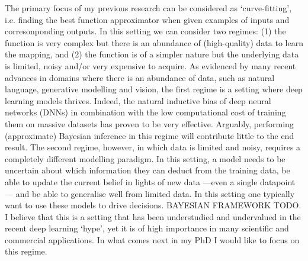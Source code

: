 The primary focus of my previous research can be considered as `curve-fitting', i.e. finding the best function approximator when given examples of inputs and corresonponding outputs. In this setting we can consider two regimes: (1) the function is very complex but there is an abundance of (high-quality) data to learn the mapping, and (2) the function is of a simpler nature but the underlying data is limited, noisy and/or very expensive to acquire. As evidenced by many recent advances in domains where there is an abundance of data, such as natural language, generative modelling and vision, the first regime is a setting where deep learning models thrives. Indeed, the natural inductive bias of deep neural networks (DNNs) in combination with the low computational cost of training them on massive datasets has proven to be very effective. Arguably, performing (approximate) Bayesian inference in this regime will contribute little to the end result. The second regime, however, in which data is limited and noisy, requires a completely different modelling paradigm. In this setting, a model needs to be uncertain about which information they can deduct from the training data, be able to update the current belief in lights of new data ---even a single datapoint--- and be able to generalise well from limited data. In this setting one typically want to use these models to drive decisions. BAYESIAN FRAMEWORK TODO.  I believe that this is a setting that has been understudied and undervalued in the recent deep learning `hype', yet it is of high importance in many scientific and commercial applications. In what comes next in my PhD I would like to focus on this regime.



